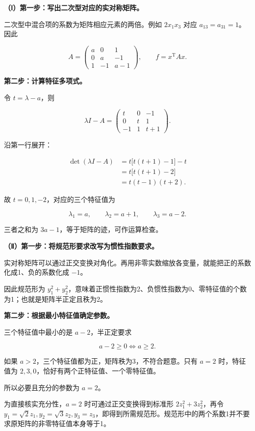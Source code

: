 \documentclass[UTF8,11pt,fontset=windows]{ctexart}
\begin{document}
\textbf{（Ⅰ）第一步：写出二次型对应的实对称矩阵。}

二次型中混合项的系数为矩阵相应元素的两倍。例如 $2x_1x_3$ 对应 $a_{13}=a_{31}=1$。因此

$$
A=\begin{pmatrix}a&0&1\\0&a&-1\\1&-1&a-1\end{pmatrix},
\qquad f=x^{\mathrm T}Ax.
$$

\textbf{第二步：计算特征多项式。}

令 $t=\lambda-a$，则

$$
\lambda I-A=\begin{pmatrix}t&0&-1\\0&t&1\\-1&1&t+1\end{pmatrix}.
$$

沿第一行展开：

$$
\begin{aligned}
\det(\lambda I-A)
&=t\bigl[t(t+1)-1\bigr]-t\\
&=t\bigl[t(t+1)-2\bigr]\\
&=t(t-1)(t+2).
\end{aligned}
$$

故 $t=0,1,-2$，对应的三个特征值为

$$
\boxed{\lambda_1=a,\qquad\lambda_2=a+1,\qquad\lambda_3=a-2}.
$$

三者之和为 $3a-1$，等于矩阵的迹，可作运算检查。

\textbf{（Ⅱ）第一步：将规范形要求改写为惯性指数要求。}

实对称矩阵可以通过正交变换对角化。再用非零实数缩放各变量，就能把正的系数化成1、负的系数化成 $-1$。

因此规范形为 $y_1^2+y_2^2$，意味着正惯性指数为2、负惯性指数为0、零特征值的个数为1；也就是矩阵半正定且秩为2。

\textbf{第二步：根据最小特征值确定参数。}

三个特征值中最小的是 $a-2$，半正定要求

$$
a-2\ge0\Longleftrightarrow a\ge2.
$$

如果 $a>2$，三个特征值都为正，矩阵秩为3，不符合题意。只有 $a=2$ 时，特征值为 $2,3,0$，恰好有两个正特征值、一个零特征值。

所以必要且充分的参数为 $\boxed{a=2}$。

为直接核实充分性，$a=2$ 时可通过正交变换得到标准形 $2z_1^2+3z_2^2$，再令 $y_1=\sqrt2z_1,y_2=\sqrt3z_2,y_3=z_3$，即得到所需规范形。规范形中的两个系数1并不要求原矩阵的非零特征值本身等于1。
\end{document}
